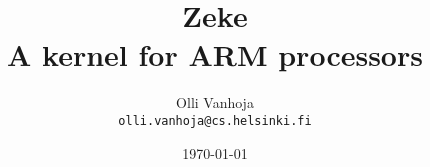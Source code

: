 \documentclass[11pt,oneside,a4paper]{book}
\title{%
  Zeke\\
  A kernel for ARM processors
}
\author{%
  Olli Vanhoja\\
  \texttt{olli.vanhoja@cs.helsinki.fi}
}
\date{%
\today
}
\begin{document}
  \maketitle
  \tableofcontents
  
  
  
  
  
  
  
  {}
  
\end{document}
